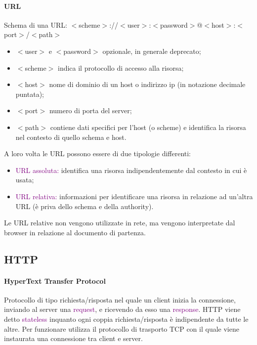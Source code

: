 \paragraph{URL} Schema di una URL:
\newline $<$scheme$>$://$<$user$>$:$<$password$>$@$<$host$>$:$<$port$>$/$<$path$>$
\begin{itemize}
    \item $<$user$>$ e $<$password$>$ opzionale, in generale deprecato;
    \item $<$scheme$>$ indica il protocollo di accesso alla risorsa;
    \item $<$host$>$ nome di dominio di un host o indirizzo ip (in notazione decimale puntata);
    \item $<$port$>$ numero di porta del server;
    \item $<$path$>$ contiene dati specifici per l’host (o scheme) e identifica la risorsa nel contesto di quello schema e host.
\end{itemize}
A loro volta le URL possono essere di due tipologie differenti:
\begin{itemize}
    \item \textcolor{purple}{URL assoluta:} identifica una risorsa indipendentemente dal contesto in cui è usata;
    \item \textcolor{purple}{URL relativa:} informazioni per identificare una risorsa in relazione ad un’altra URL (è priva dello schema e della authority).
\end{itemize}
Le URL relative non vengono utilizzate in rete, ma vengono interpretate dal browser in relazione al documento di partenza.

\subsection{HTTP}
\paragraph{HyperText Transfer Protocol} Protocollo di tipo richiesta/risposta nel quale un client inizia la connessione, inviando al server una \textcolor{purple}{request}, e ricevendo da esso una \textcolor{purple}{response}. 
HTTP viene detto \textcolor{purple}{stateless} inquanto ogni coppia richiesta/risposta è indipendente da tutte le altre. 
Per funzionare utilizza il protocollo di trasporto TCP con il quale viene instaurata una connessione tra client e server.


